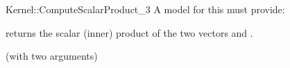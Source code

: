 \begin{ccRefFunctionObjectConcept}{Kernel::ComputeScalarProduct_3}
A model for this must provide:


{returns the scalar (inner) product of the two vectors  and .}

\ccRefines
{} (with two arguments)

\ccSeeAlso
{}\\

\end{ccRefFunctionObjectConcept}
